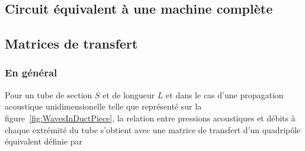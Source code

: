 \subsection{Circuit équivalent à une machine complète}

\subsection{Matrices de transfert}
\subsubsection{En général}
Pour un tube de section $S$ et de longueur $L$ et dans le cas d'une propagation acoustique unidimensionelle telle que représenté sur la figure~\ref{fig:WavesInDuctPiece}, la relation entre pressions acoustiques et débits à chaque extrémité du tube s'obtient avec une matrice de transfert d'un quadripôle équivalent définie par  




